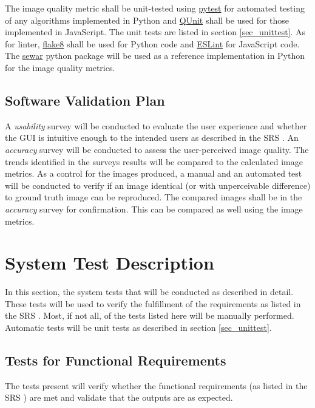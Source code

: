 \documentclass[12pt, titlepage]{article}
\begin{document}
The image quality metric shall be unit-tested using \href{https://pytest.org}{pytest} for 
automated testing of any algorithms implemented in Python and \href{https://qunitjs.com}{QUnit} 
shall be used for those implemented in JavaScript. The unit tests are listed in 
section \ref{sec_unittest}.
As for linter, \href{https://flake8.pycqa.org}{flake8} shall be used for Python code 
and \href{https://eslint.org}{ESLint} for JavaScript code.
The \href{https://github.com/andrewekhalel/sewar}{sewar} python package will be 
used as a reference implementation in Python for the image quality metrics.


\subsection{Software Validation Plan}
A \textit{usability} survey will be conducted to evaluate the user experience and whether 
the GUI is intuitive enough to the intended users as described in the SRS \citep{SRS}.
An \textit{accuracy} survey will be conducted to assess the user-perceived image quality. 
The trends identified in the surveys results will be compared to the calculated image metrics.
As a control for the images produced, a manual and an automated test will be conducted to verify if 
an image identical (or with unperceivable difference) to ground truth image can be reproduced.
The compared images shall be in the \textit{accuracy} survey for confirmation. This can be compared
as well using the image metrics. 


\section{System Test Description}

In this section, the system tests that will be conducted as described in detail. These tests
will be used to verify the fulfillment of the requirements as listed in the SRS \citep{SRS}.
Most, if not all, of the tests listed here will be manually performed. Automatic
tests will be unit tests as described in section \ref{sec_unittest}.

\subsection{Tests for Functional Requirements}

The tests present will verify whether the functional requirements 
(as listed in the SRS \cite{SRS}) are met and validate that the outputs
are as expected.
\end{document}
